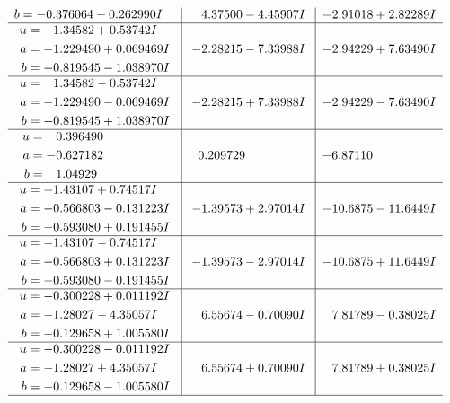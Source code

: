 \documentclass[1p]{elsarticle_modified}
\theoremstyle{definition}
\begin{document}
$$\begin{array}{c|c|c}
\begin{aligned}
b &= -0.376064 - 0.262990 I\end{aligned}
 & \phantom{-}4.37500 - 4.45907 I & -2.91018 + 2.82289 I \\ \hline\begin{aligned}
u &= \phantom{-}1.34582 + 0.53742 I \\
a &= -1.229490 + 0.069469 I \\
b &= -0.819545 - 1.038970 I\end{aligned}
 & -2.28215 - 7.33988 I & -2.94229 + 7.63490 I \\ \hline\begin{aligned}
u &= \phantom{-}1.34582 - 0.53742 I \\
a &= -1.229490 - 0.069469 I \\
b &= -0.819545 + 1.038970 I\end{aligned}
 & -2.28215 + 7.33988 I & -2.94229 - 7.63490 I \\ \hline\begin{aligned}
u &= \phantom{-}0.396490\phantom{ +0.000000I} \\
a &= -0.627182\phantom{ +0.000000I} \\
b &= \phantom{-}1.04929\phantom{ +0.000000I}\end{aligned}
 & \phantom{-}0.209729\phantom{ +0.000000I} & -6.87110\phantom{ +0.000000I} \\ \hline\begin{aligned}
u &= -1.43107 + 0.74517 I \\
a &= -0.566803 - 0.131223 I \\
b &= -0.593080 + 0.191455 I\end{aligned}
 & -1.39573 + 2.97014 I & -10.6875 - 11.6449 I \\ \hline\begin{aligned}
u &= -1.43107 - 0.74517 I \\
a &= -0.566803 + 0.131223 I \\
b &= -0.593080 - 0.191455 I\end{aligned}
 & -1.39573 - 2.97014 I & -10.6875 + 11.6449 I \\ \hline\begin{aligned}
u &= -0.300228 + 0.011192 I \\
a &= -1.28027 - 4.35057 I \\
b &= -0.129658 + 1.005580 I\end{aligned}
 & \phantom{-}6.55674 - 0.70090 I & \phantom{-}7.81789 - 0.38025 I \\ \hline\begin{aligned}
u &= -0.300228 - 0.011192 I \\
a &= -1.28027 + 4.35057 I \\
b &= -0.129658 - 1.005580 I\end{aligned}
 & \phantom{-}6.55674 + 0.70090 I & \phantom{-}7.81789 + 0.38025 I\\
 \hline 
 \end{array}$$\newpage
\end{document}
